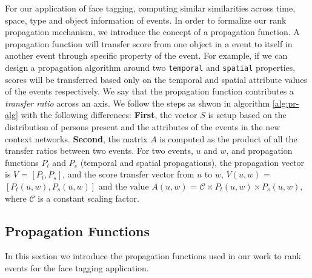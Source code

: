 For our application of face tagging, computing similar similarities across time, space, type and object information of events. In order to formalize our rank propagation mechanism, we introduce the concept of a propagation function. A propagation function will transfer score from one object in a event to itself in another event through specific property of the event. For example, if we can design a propagation algorithm around two \texttt{temporal} and \texttt{spatial} properties, scores will be transferred based only on the temporal and spatial attribute values of the events respectively. We say that the propagation function contributes a \textit{transfer ratio} across an axis. We follow the steps as shwon in algorithm \ref{alg:pr-alg} with the following differences: \textbf{First}, the vector $S$ is setup based on the distribution of persons present and the attributes of the events in the new context networks. \textbf{Second}, the matrix $A$ is computed as the product of all the transfer ratios between two events. For two events, $u$ and $w$, and propagation functions $P_t$ and $P_s$ (temporal and spatial propagations), the propagation vector is $V$ = $[P_t, P_s]$, and the score transfer vector from $u$ to $w$, $V(u, w)$ = $[P_t(u, w), P_s(u, w)]$ and the value $A(u, w)$ = $\mathcal{C} \times P_t(u, w) \times P_s(u, w)$, where $\mathcal C$ is a constant scaling factor.

\subsection{Propagation Functions}

In this section we introduce the propagation functions used in our work to rank events for the face tagging application.


